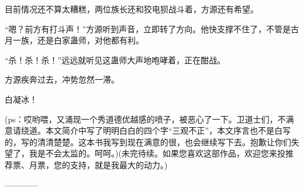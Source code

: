 \begin{this_body}
目前情况还不算太糟糕，两位族长还和狡电狈战斗着，方源还有希望。

“嗯？前方有打斗声！”方源听到声音，立即转了方向。他快支撑不住了，不管是古月一族，还是白家蛊师，对他都有利。

“杀！杀！杀！”远远就听见这蛊师大声地咆哮着，正在酣战。

方源疾奔过去，冲势忽然一滞。

白凝冰！

(ps：哎哟喂，又涌现一个秀道德优越感的喷子，被恶心了一下。卫道士们，不满意请绕道。本文简介中写了明明白白的四个字“三观不正”，本文序言也不是白写的，写的清清楚楚。这本书我写到现在满意的很，也会继续写下去。抱歉让你们失望了，我是不会太监的。呵呵。)(未完待续。如果您喜欢这部作品，欢迎您来投推荐票、月票，您的支持，就是我最大的动力。)

------------

\end{this_body}

